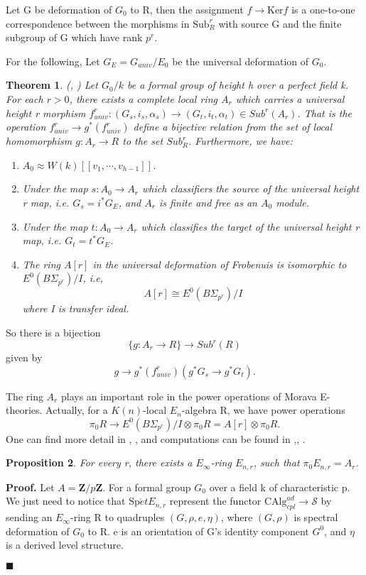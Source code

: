 \documentclass[12pt]{article}
\newtheorem{theorem}{Theorem}[section] %
\newtheorem{proposition}[theorem]{Proposition}
\theoremstyle{thry}
\renewenvironment{proof}
{\par \noindent \textbf{Proof.}}
{ \par \hfill $\blacksquare$ \quad \par }
\def  \CAlg     {\mathrm{CAlg}}
\def  \Spet     {\mathrm{Sp}\acute{e}t}
\def  \cs       {\mathcal{S}}
\def  \bz       {\mathbf{Z}}
\begin{document}
Let G be deformation of $G_0$ to R, then the assignment $f \to \mathrm{Ker}f$ is a one-to-one correspondence between the morphisms  in $\mathrm{Sub}^r_R$ with source G and the finite subgroup of G which have rank $p^r$.

For the following, Let $G_E=G_{univ} / E_0 $ be the universal deformation of $G_0$.
\begin{theorem}(\cite{strickland1997finite}, \cite{strickland1998morava})
	Let $G_0/k$ be a formal group of height h over a perfect field k. For each $r>0$, there exists a complete local ring $A_r$ which carries a universal height r morphism $f^r_{univ}: (G_s, i_s, \alpha_s) \to (G_t, i_t, \alpha_t) \in Sub^r(A_r)$. That is the operation $f_{univ}^r \to g^*(f_{univ}^r)$ define a bijective relation from the set of local homomorphism
	$g: A_r \to R$ to the set $Sub^r_R$. Furthermore, we have:
	\begin{enumerate}
		\item $A_0  \approx W(k)[[v_1,\cdots, v_{h-1}]]$.
		\item  Under the map  $s: A_0 \to A_r$ which classifiers the source of the universal height r map, i.e. $G_s = i^* G_E$, and $A_r$ is finite and free as an $A_0$ module.
		\item  Under the map $t: A_0  \to A_r$ which classifies the target of the universal height r map, i.e. $G_t =  t^* G_E$.
		\item 	The ring $A[r]$ in the universal deformation of Frobenuis is isomorphic to $E^0(B \Sigma _{p^r})/I$, i.e,
		$$
		A[r] \cong  E^0(B \Sigma _{p^r})/I
		$$
		where I is transfer ideal.
	\end{enumerate}
\end{theorem}
So there is a bijection 
$$
\{  g: A_r \to R \}  \to  Sub^r(R)
$$
given by 
$$
g \to  g^* (f^r_{univ}) (g^* G_s  \to g^* G_t).
$$

The ring $A_r$  plays an important role in the power operations of Morava E-theories. Actually, for a $K(n)$-local $E_n$-algebra R, we have power operations
$$ 
\pi_0 R \to  E^0(  B \Sigma_{p^r})/I  \otimes  \pi_0 R  =  A[r]\otimes \pi_0 R. 
$$
One can find more detail in \cite{rezk2009congruence}, \cite{rezk2013power}, and computations can be found in \cite{rezk2008power},\cite{zhu2014power}, \cite{zhu2019semistable}.




\begin{proposition}
	For every r, there exists a $E_{\infty}$-ring $E_{n,r}$, such that $\pi_0 E_{n,r}= A_r$.
\end{proposition}
\begin{proof}
	 Let $A= \bz/p \bz$. For a formal group $G_0$ over a  field  k of characteristic p.   We just need to notice that $\Spet E_{n,r}$ represent the functor $\CAlg^{ad}_{cpl} \to \cs$ by sending an $E_{\infty}$-ring R to  quadruples $(G, \rho, e, \eta)$, where $(G, \rho)$ is  spectral deformation of $G_0$ to R.  e is an orientation of G's identity component $G^0$, and $\eta$ is a derived level structure.
\end{proof}







\end{document}
